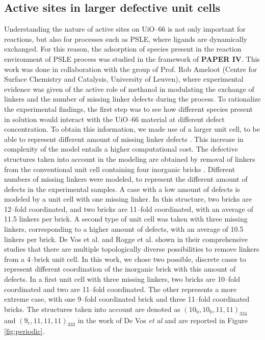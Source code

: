 \subsection*{Active sites in larger defective unit cells}
Understanding the nature of active sites on UiO--66 is not only important for reactions, but also for processes such as PSLE, where ligands are dynamically exchanged. For this reason, the adsorption of species present in the reaction environment of PSLE process was studied in the framework of \textbf{PAPER IV}. This work was done in collaboration with the group of Prof. Rob Ameloot (Centre for Surface Chemistry and Catalysis, University of Leuven), where experimental evidence was given of the active role of methanol in modulating the exchange of linkers and the number of missing linker defects during the process. 
\npar
To rationalize the experimental findings, the first step was to see how different species present in solution would interact with the UiO--66 material at different defect concentration. To obtain this information, we made use of a larger unit cell, to be able to represent different amount of missing linker defects \cite{rogge2016thermodynamic, devos2017missing, svane2018vacancy}. This increase in complexity of the model entails a higher computational cost. The defective structures taken into account in the modeling are obtained by removal of linkers from the conventional unit cell containing four inorganic  bricks \cite{cavka2008new}. Different numbers of missing linkers were modeled, to represent the different amount of defects in the experimental samples. A case with a low amount of defects is modeled by a unit cell with one missing linker. In this structure, two bricks are 12--fold coordinated, and two bricks are 11--fold coordinated, with an average of 11.5 linkers per brick. A second type of unit cell was taken with three missing linkers, corresponding to a higher amount of defects, with an average of 10.5 linkers per brick. De Vos et al. and Rogge et al.\cite{devos2017missing, rogge2016thermodynamic} shown in their comprehensive studies that there are multiple topologically diverse possibilities to remove linkers from a 4--brick unit cell. In this work, we chose two possible, discrete cases to represent different coordination of the inorganic brick with this amount of defects. In a first unit cell with three missing linkers, two bricks are 10--fold coordinated and two are 11--fold coordinated. The other represents a more extreme case, with one 9--fold coordinated brick and three 11--fold coordinated bricks. The structures taken into account are denoted as $\mathrm{(10_{b}, 10_{b}, 11, 11)_{334}}$ and $\mathrm{(9_{c}, 11, 11, 11)_{333}}$ in the work of De Vos \textit{et al}\cite{devos2017missing} and are reported in Figure \ref{fig:periodic}.
